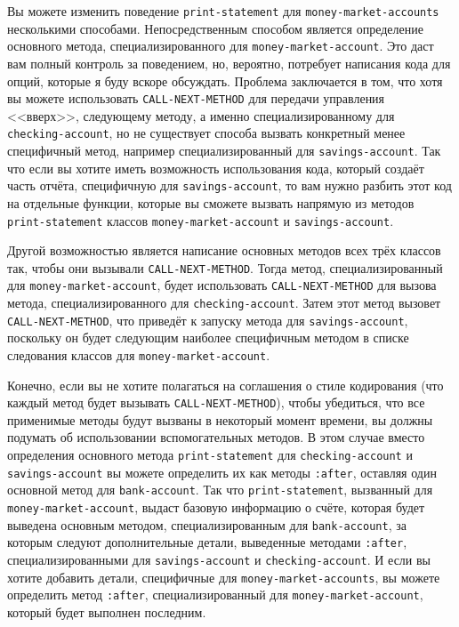 Вы можете изменить поведение \lstinline{print-statement} для \lstinline{money-market-accounts}
несколькими способами.  Непосредственным способом является определение основного метода,
специализированного для \lstinline{money-market-account}.  Это даст вам полный контроль за
поведением, но, вероятно, потребует написания кода для опций, которые я буду вскоре
обсуждать.  Проблема заключается в том, что хотя вы можете использовать
\lstinline{CALL-NEXT-METHOD} для передачи управления <<вверх>>, следующему методу, а именно
специализированному для \lstinline{checking-account}, но не существует способа вызвать
конкретный менее специфичный метод, например специализированный для
\lstinline{savings-account}.  Так что если вы хотите иметь возможность использования кода,
который создаёт часть отчёта, специфичную для \lstinline{savings-account}, то вам нужно разбить
этот код на отдельные функции, которые вы сможете вызвать напрямую из методов
\lstinline{print-statement} классов \lstinline{money-market-account} и \lstinline{savings-account}.

Другой возможностью является написание основных методов всех трёх классов так, чтобы они
вызывали \lstinline{CALL-NEXT-METHOD}.  Тогда метод, специализированный для
\lstinline{money-market-account}, будет использовать \lstinline{CALL-NEXT-METHOD} для вызова метода,
специализированного для \lstinline{checking-account}.  Затем этот метод вызовет
\lstinline{CALL-NEXT-METHOD}, что приведёт к запуску метода для \lstinline{savings-account},
поскольку он будет следующим наиболее специфичным методом в списке следования классов для
\lstinline{money-market-account}.

Конечно, если вы не хотите полагаться на соглашения о стиле кодирования (что каждый метод
будет вызывать \lstinline{CALL-NEXT-METHOD}), чтобы убедиться, что все применимые методы будут
вызваны в некоторый момент времени, вы должны подумать об использовании вспомогательных
методов.  В этом случае вместо определения основного метода \lstinline{print-statement} для
\lstinline{checking-account} и \lstinline{savings-account} вы можете определить их как методы
\lstinline{:after}, оставляя один основной метод для \lstinline{bank-account}.  Так что
\lstinline{print-statement}, вызванный для \lstinline{money-market-account}, выдаст базовую
информацию о счёте, которая будет выведена основным методом, специализированным для
\lstinline{bank-account}, за которым следуют дополнительные детали, выведенные методами
\lstinline{:after}, специализированными для \lstinline{savings-account} и \lstinline{checking-account}. И
если вы хотите добавить детали, специфичные для \lstinline{money-market-accounts}, вы можете
определить метод \lstinline{:after}, специализированный для \lstinline{money-market-account},
который будет выполнен последним.

